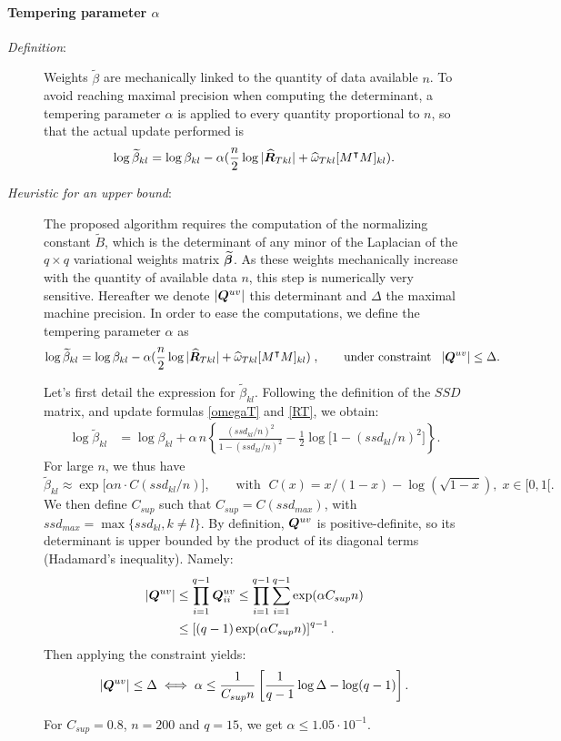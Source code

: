 \paragraph{Tempering parameter $\alpha$} \label{alpha}
\begin{description}
\item[\textit{Definition}: ]Weights $\widetilde{\beta}$ are mechanically linked to the quantity of data available $n$. To avoid reaching maximal precision when computing the determinant, a tempering parameter $\alpha$ is applied to every quantity proportional to $n$, so that the actual update performed is $$\log \widetilde{\beta}_{kl} = \log \beta_{kl} - \alpha(\frac{n}{2}\log|\widehat{{\boldsymbol{R}}}_{Tkl}| + \widehat{\omega}_{Tkl} [M^\intercal M]_{kl}).$$
\item[\textit{Heuristic for an upper bound}: ] The proposed algorithm requires the computation of the normalizing constant $\widetilde{B}$, which is the determinant of any minor of the Laplacian  of the $q\times q$ variational weights matrix ${\widetilde{{\boldsymbol{\beta}}}}$. As these weights  mechanically increase with the quantity of available data $n$, this step is numerically very sensitive.  Hereafter we denote $|{\boldsymbol{Q}}^{uv}|$ this determinant and $\Delta$ the maximal machine precision. In order to ease the computations, we define the tempering parameter $\alpha$ as $$\log \widetilde{\beta}_{kl} = \log \beta_{kl} - \alpha(\frac{n}{2}\log|\widehat{{\boldsymbol{R}}}_{Tkl}| + \widehat{\omega}_{Tkl} [M^\intercal M]_{kl})\;,\qquad \text{under constraint}\;\;\; |{\boldsymbol{Q}}^{uv}| \leq \Delta.$$

Let's first detail the expression for $\widetilde{\beta}_{kl}$. Following the definition of the $SSD$ matrix, and update formulas \eqref{omegaT} and \eqref{RT}, we obtain:
\begin{align*}
    \log \widetilde{\beta}_{kl} &=\log \beta_{kl} +\alpha \,n\left\{\frac{(ssd_{kl}/n)^2}{1-(ssd_{kl}/n)^2} -\frac12\log\big[1-(ssd_{kl}/n)^2\big]\right\}.
\end{align*}
For large $n$, we thus have $$\widetilde{\beta}_{kl}\approx \exp \big[\alpha n \cdot C(ssd_{kl}/n)\big], \qquad \text{with }\; C(x)=x/(1-x) -\log(\sqrt{1-x}),\; x\in [0,1[.$$ 
We then define $C_{sup}$ such that $C_{sup} = C(ssd_{max})$, with $ ssd_{max}=\max\{ssd_{kl}, k\neq l\}$.
By definition, ${\boldsymbol{Q}}^{uv}$ is positive-definite, so its determinant is upper bounded by the product of its diagonal terms (Hadamard's inequality). Namely:
\begin{align*}
    |{\boldsymbol{Q}}^{uv}|&\leq \prod_{i=1}^{q-1} {\boldsymbol{Q}}^{uv}_{ii} \leq \prod_{i=1}^{q-1}\sum_{i=1}^{q-1} \exp (\alpha C_{sup} n)\\
    &\leq \left[(q-1)\exp(\alpha C_{sup} n)\right]^{q-1}.
\end{align*}
Then applying the constraint yields:
\begin{align*}
    |{\boldsymbol{Q}}^{uv}| \leq \Delta \iff  \alpha \leq \frac{1}{C_{sup} n} \left[ \frac{1}{q-1}\log \Delta - \log(q-1)\right].
\end{align*}

For $C_{sup}=0.8$, $n=200$ and $q=15$, we get $\alpha \leq 1.05\cdot 10^{-1}$.
\end{description}


